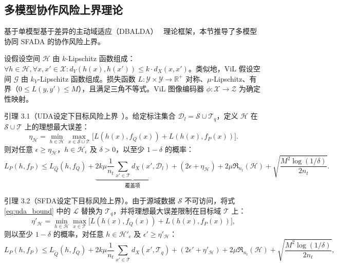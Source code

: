 \subsection{多模型协作风险上界理论}

基于单模型基于差异的主动域适应（DBALDA）~\cite{mathelin2022discrepancy} 理论框架，本节推导了多模型协同 SFADA 的协作风险上界。

设假设空间 $\mathcal{H}$ 由 $k$-Lipschitz 函数组成：$\forall h\in\mathcal{H},\forall x,x'\in\mathcal{X}: d_Y(h(x),h(x'))\leq k\cdot d_X(x,x')$。类似地，ViL 假设空间 $\mathcal{G}$ 由 $k_V$-Lipschitz 函数组成。损失函数 $L:\mathcal{Y}\times\mathcal{Y}\to\mathbb{R}^+$ 对称、$\mu$-Lipschitz、有界（$0\leq L(y,y')\leq M$），且满足三角不等式。ViL 图像编码器 $\phi:\mathcal{X}\to\mathcal{Z}$ 为确定性映射。

引理 3.1（UDA设定下目标风险上界~\cite{mathelin2022discrepancy}）。给定标注集合 $\mathcal{D}_l=\mathcal{S}\cup\mathcal{T}_q$，定义 $\mathcal{H}$ 在 $\mathcal{S}\cup\mathcal{T}$ 上的理想最大误差：
\begin{equation}
\eta_{\mathcal{H}} = \min_{h\in\mathcal{H}}\max_{x\in\mathcal{S}\cup\mathcal{T}}\big[L(h(x), f_Q(x)) + L(h(x), f_P(x))\big].
\label{eq:eta_H}
\end{equation}
则对任意 $\epsilon\geq\eta_{\mathcal{H}}$，$h\in\mathcal{H}_\epsilon$ 及 $\delta>0$，以至少 $1-\delta$ 的概率：
\begin{equation}
L_P(h,f_P) \leq L_{\hat{Q}}(h,f_Q) + \underbrace{2k\mu\frac{1}{n_t}\sum_{x'\in\mathcal{T}}d_X(x',\mathcal{D}_l)}_{\text{覆盖项}} + (2\epsilon+\eta_{\mathcal{H}}) + 2\mu\mathfrak{R}_{n_t}(\mathcal{H}) + \sqrt{\frac{M^2\log(1/\delta)}{2n_t}}.
\label{eq:uda_bound}
\end{equation}

引理 3.2（SFDA设定下目标风险上界）。由于源域数据 $\mathcal{S}$ 不可访问，将式 \eqref{eq:uda_bound} 中的 $\mathcal{L}$ 替换为 $\mathcal{T}_q$，并将理想最大误差限制在目标域 $\mathcal{T}$ 上：
\begin{equation}
\eta'_{\mathcal{H}} = \min_{h\in\mathcal{H}}\max_{x\in\mathcal{T}}\big[L(h(x), f_Q(x)) + L(h(x), f_P(x))\big],
\end{equation}
则以至少 $1-\delta$ 的概率，对任意 $h\in\mathcal{H}'_{\epsilon}$ 及 $\epsilon'\geq\eta'_{\mathcal{H}}$：
\begin{equation}
L_P(h,f_P) \leq L_{\tilde{Q}}(h,f_Q) + 2k\mu\frac{1}{n_t}\sum_{x'\in\mathcal{T}}d_X(x',\mathcal{T}_q) + (2\epsilon'+\eta'_{\mathcal{H}}) + 2\mu\mathfrak{R}_{n_t}(\mathcal{H}) + \sqrt{\frac{M^2\log(1/\delta)}{2n_t}},
\label{eq:sfda_bound}
\end{equation}

